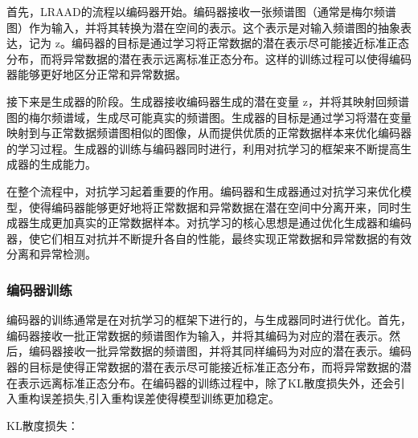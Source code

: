 首先，LRAAD的流程以编码器开始。编码器接收一张频谱图（通常是梅尔频谱图）作为输入，并将其转换为潜在空间的表示。这个表示是对输入频谱图的抽象表达，记为 z。编码器的目标是通过学习将正常数据的潜在表示尽可能接近标准正态分布，而将异常数据的潜在表示远离标准正态分布。这样的训练过程可以使得编码器能够更好地区分正常和异常数据。

接下来是生成器的阶段。生成器接收编码器生成的潜在变量 z，并将其映射回频谱图的梅尔频谱域，生成尽可能真实的频谱图。生成器的目标是通过学习将潜在变量映射到与正常数据频谱图相似的图像，从而提供优质的正常数据样本来优化编码器的学习过程。生成器的训练与编码器同时进行，利用对抗学习的框架来不断提高生成器的生成能力。

在整个流程中，对抗学习起着重要的作用。编码器和生成器通过对抗学习来优化模型，使得编码器能够更好地将正常数据和异常数据在潜在空间中分离开来，同时生成器生成更加真实的正常数据样本。对抗学习的核心思想是通过优化生成器和编码器，使它们相互对抗并不断提升各自的性能，最终实现正常数据和异常数据的有效分离和异常检测。

\subsubsection{编码器训练}

编码器的训练通常是在对抗学习的框架下进行的，与生成器同时进行优化。首先，编码器接收一批正常数据的频谱图作为输入，并将其编码为对应的潜在表示。然后，编码器接收一批异常数据的频谱图，并将其同样编码为对应的潜在表示。编码器的目标是使得正常数据的潜在表示尽可能接近标准正态分布，而将异常数据的潜在表示远离标准正态分布。在编码器的训练过程中，除了KL散度损失外，还会引入重构误差损失,引入重构误差使得模型训练更加稳定。

KL散度损失：


